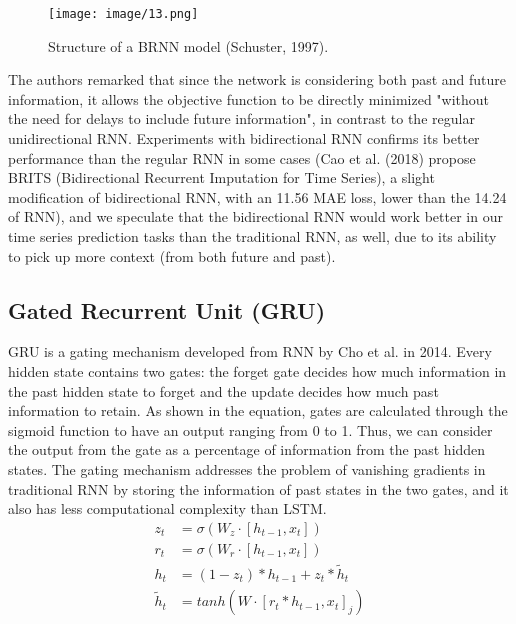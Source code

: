 \documentclass[letterpaper, 10 pt, conference]{ieeeconf}  %
\begin{document}
        \begin{figure}[thpb]
            \centering
             \texttt{[image: image/13.png]}
            \caption{Structure of a BRNN model (Schuster, 1997).}
            \label{figurelabel}
        \end{figure}

        The authors remarked that since the network is considering both past and future information, it allows the objective function to be directly minimized "without the need for delays to include future information", in contrast to the regular unidirectional RNN. Experiments with bidirectional RNN confirms its better performance than the regular RNN in some cases (Cao et al. (2018) propose BRITS (Bidirectional Recurrent Imputation for Time Series), a slight modification of bidirectional RNN, with an 11.56 MAE loss, lower than the 14.24 of RNN), and we speculate that the bidirectional RNN would work better in our time series prediction tasks than the traditional RNN, as well, due to its ability to pick up more context (from both future and past).

    \subsection{Gated Recurrent Unit (GRU)}
        GRU is a gating mechanism developed from RNN by Cho et al. in 2014. Every hidden state contains two gates: the forget gate decides how much information in the past hidden state to forget and the update decides how much past information to retain. As shown in the equation, gates are calculated through the sigmoid function to have an output ranging from 0 to 1. Thus, we can consider the output from the gate as a percentage of information from the past hidden states. The gating mechanism addresses the problem of vanishing gradients in traditional RNN by storing the information of past states in the two gates, and it also has less computational complexity than LSTM.
        \begin{align*}
            z_t &= \sigma(W_z \cdot [h_{t-1},x_t])\\
            r_t  &= \sigma(W_r \cdot [h_{t-1},x_t])\\
            h_t &= (1-z_t) \ast h_{t-1} + z_t \ast \tilde{h}_t\\
            \tilde h_t &= tanh(W \cdot [r_t \ast h_{t-1}, x_t]_j)\\
        \end{align*}
\end{document}
